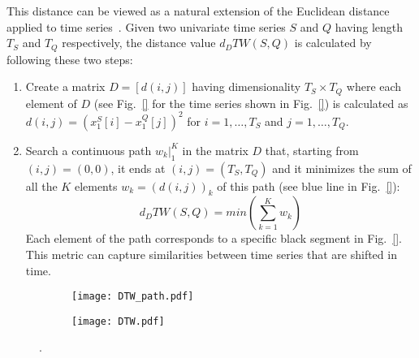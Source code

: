 This distance can be viewed as a natural extension of the Euclidean distance applied to time series~\cite{}. 
Given two univariate time series $S$ and $Q$ having length $T_S$ and $T_Q$ respectively, the distance value 
$d_DTW (S,Q)$ is calculated by following these two steps:
\begin{enumerate}
  \item Create a matrix $D=[d(i,j)]$ having dimensionality $T_S \times T_Q$ where each element of $D$ (see Fig.~\ref{} for 
        the time series shown in Fig.~\ref{}) is calculated as $d(i,j)=(x_1^S[i]-x_1^Q[j])^2$ for
        $i=1,\ldots,T_S$ and $j=1,\ldots,T_Q$.
  \item Search a continuous path $w_k|_1^K$ in the matrix $D$ that, starting from $(i,j)=(0,0)$, it ends at 
        $(i,j)=(T_S,T_Q)$ and it minimizes the sum of all the $K$ elements $w_k=(d(i,j))_k$ of this
       path (see blue line in Fig.~\ref{}):
      \begin{equation}
        d_DTW(S,Q) = min⁡(\sum_{k=1}^{K} w_k)
        \label{eq:dtw}
      \end{equation}       
       Each element of the path corresponds to a specific black segment in Fig.~\ref{}. This metric can capture 
       similarities between time series that are shifted in time.
\end{enumerate}

\begin{figure}
  \centering
  \begin{subfigure}{.5\textwidth}
    \centering
    \texttt{[image: DTW\_path.pdf]}
  \end{subfigure}%
  \begin{subfigure}{.5\textwidth}
    \centering
    \texttt{[image: DTW.pdf]}
  \end{subfigure}
  \caption{.}
  \label{fig:DTW}
\end{figure}

